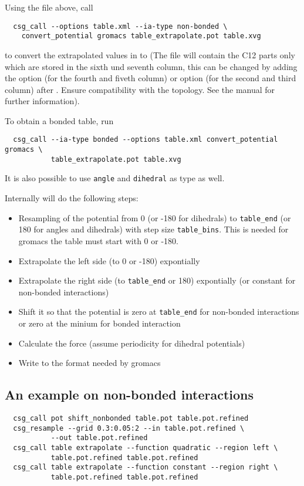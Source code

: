 Using the  file above, call
\begin{verbatim}
  csg_call --options table.xml --ia-type non-bonded \
    convert_potential gromacs table_extrapolate.pot table.xvg
\end{verbatim}
to convert the extrapolated values in  to  (The file will contain the \gromacs C12 parts only which are stored in the sixth und seventh column, this can be changed by adding the  option (for the fourth and fiveth column) or  option (for the second and third column) after . Ensure compatibility with the \gromacs topology. See the \gromacs manual for further information).

To obtain a bonded table, run
\begin{verbatim}
  csg_call --ia-type bonded --options table.xml convert_potential gromacs \
           table_extrapolate.pot table.xvg
\end{verbatim}
It is also possible to use \texttt{angle} and \texttt{dihedral} as type as well.

Internally \progopt{convert\_potential gromacs} will do the following steps:
\begin{itemize}
\item Resampling of the potential from 0 (or -180 for dihedrals) to \texttt{table\_end} (or 180 for angles and dihedrals) with step size \texttt{table\_bins}. This is needed for gromacs the table must start with 0 or -180.
\item Extrapolate the left side (to 0 or -180) expontially
\item Extrapolate the right side (to \texttt{table\_end} or 180) expontially (or constant for non-bonded interactions)
\item Shift it so that the potential is zero at \texttt{table\_end} for non-bonded interactions or zero at the minium for bonded interaction
\item Calculate the force (assume periodicity for dihedral potentials)
\item Write to the format needed by gromacs
\end{itemize}

\subsection{An example on non-bonded interactions}
\begin{verbatim}
  csg_call pot shift_nonbonded table.pot table.pot.refined
  csg_resample --grid 0.3:0.05:2 --in table.pot.refined \
           --out table.pot.refined
  csg_call table extrapolate --function quadratic --region left \
           table.pot.refined table.pot.refined
  csg_call table extrapolate --function constant --region right \
           table.pot.refined table.pot.refined
\end{verbatim}

